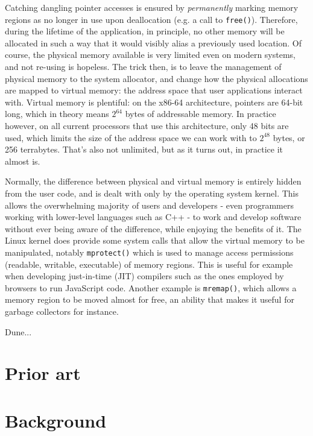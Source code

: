 Catching dangling pointer accesses is ensured by \emph{permanently} marking memory regions as no longer in use upon deallocation (e.g. a call to \lstinline!free()!). Therefore, during the lifetime of the application, in principle, no other memory will be allocated in such a way that it would visibly alias a previously used location. Of course, the physical memory available is very limited even on modern systems, and not re-using is hopeless. The trick then, is to leave the management of physical memory to the system allocator, and change how the physical allocations are mapped to virtual memory: the address space that user applications interact with. Virtual memory is plentiful: on the x86-64 architecture, pointers are 64-bit long, which in theory means $2^64$ bytes of addressable memory. In practice however, on all current processors that use this architecture, only 48 bits are used, which limits the size of the address space we can work with to $2^48$ bytes, or 256 terrabytes. That's also not unlimited, but as it turns out, in practice it almost is.

Normally, the difference between physical and virtual memory is entirely hidden from the user code, and is dealt with only by the operating system kernel. This allows the overwhelming majority of users and developers - even programmers working with lower-level languages such as C++ - to work and develop software without ever being aware of the difference, while enjoying the benefits of it. The Linux kernel does provide some system calls that allow the virtual memory to be manipulated, notably \lstinline!mprotect()! which is used to manage access permissions (readable, writable, executable) of memory regions. This is useful for example when developing just-in-time (JIT) compilers such as the ones employed by browsers to run JavaScript code. Another example is \lstinline!mremap()!, which allows a memory region to be moved almost for free, an ability that makes it useful for garbage collectors for instance.

Dune...

\section{Prior art}

\section{Background}

